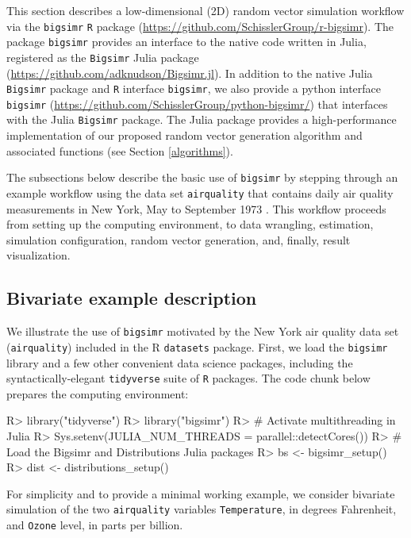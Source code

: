 \documentclass[
]{jss}
\begin{document}
This section describes a low-dimensional (2D) random vector simulation workflow via the \texttt{bigsimr} \texttt{R} package (\url{https://github.com/SchisslerGroup/r-bigsimr}). The package \texttt{bigsimr} provides an interface to the native code written in Julia, registered as the \texttt{Bigsimr} Julia package (\url{https://github.com/adknudson/Bigsimr.jl}). In addition to the native Julia \texttt{Bigsimr} package and \texttt{R} interface \texttt{bigsimr}, we also provide a python interface \texttt{bigsimr} (\url{https://github.com/SchisslerGroup/python-bigsimr/}) that interfaces with the Julia \texttt{Bigsimr} package. The Julia package provides a high-performance implementation of our proposed random vector generation algorithm and associated functions (see Section \ref{algorithms}).

The subsections below describe the basic use of \texttt{bigsimr} by stepping through an example workflow using the data set \texttt{airquality} that contains daily air quality measurements in New York, May to September 1973 \citep{Chambers1983}. This workflow proceeds from setting up the computing environment, to data wrangling, estimation, simulation configuration, random vector generation, and, finally, result visualization.

\hypertarget{bivariate-example-description}{%
\subsection{Bivariate example description}\label{bivariate-example-description}}

We illustrate the use of \texttt{bigsimr} motivated by the New York air quality data set (\texttt{airquality}) included in the R \texttt{datasets} package. First, we load the \texttt{bigsimr} library and a few other convenient data science packages, including the syntactically-elegant \texttt{tidyverse} suite of \texttt{R} packages. The code chunk below prepares the computing environment:

\begin{CodeChunk}
\begin{CodeInput}
R> library("tidyverse")
R> library("bigsimr")
R> # Activate multithreading in Julia
R> Sys.setenv(JULIA_NUM_THREADS = parallel::detectCores())
R> # Load the Bigsimr and Distributions Julia packages
R> bs <- bigsimr_setup()
R> dist <- distributions_setup()
\end{CodeInput}
\end{CodeChunk}

For simplicity and to provide a minimal working example, we consider bivariate simulation of the two \texttt{airquality} variables \texttt{Temperature}, in degrees Fahrenheit, and \texttt{Ozone} level, in parts per billion.
\end{document}
